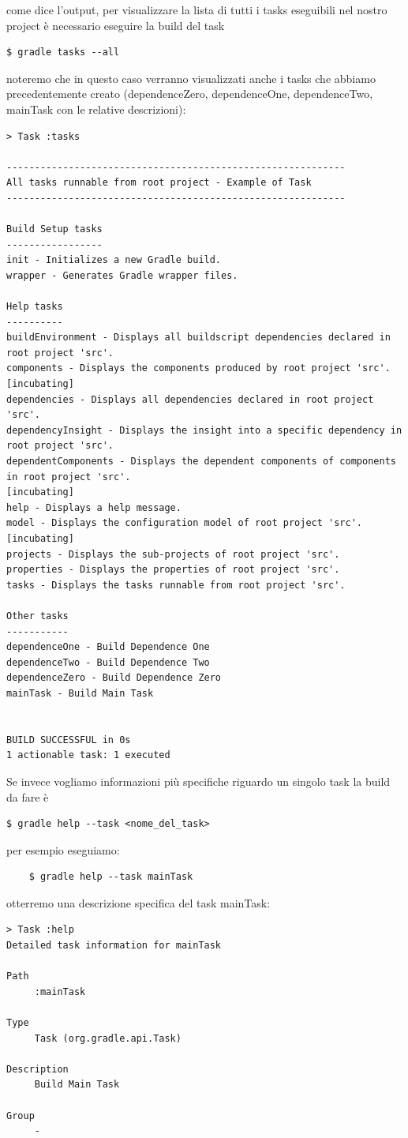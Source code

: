 come dice l'output, per visualizzare la lista di tutti i tasks eseguibili nel nostro project è necessario eseguire la build del task \begin{verbatim}$ gradle tasks --all \end{verbatim} noteremo che in questo caso verranno visualizzati anche i tasks che abbiamo precedentemente creato (dependenceZero, dependenceOne, dependenceTwo, mainTask con le relative descrizioni):
\begin{verbatim}
> Task :tasks 

------------------------------------------------------------
All tasks runnable from root project - Example of Task
------------------------------------------------------------

Build Setup tasks
-----------------
init - Initializes a new Gradle build.
wrapper - Generates Gradle wrapper files.

Help tasks
----------
buildEnvironment - Displays all buildscript dependencies declared in root project 'src'.
components - Displays the components produced by root project 'src'. [incubating]
dependencies - Displays all dependencies declared in root project 'src'.
dependencyInsight - Displays the insight into a specific dependency in root project 'src'.
dependentComponents - Displays the dependent components of components in root project 'src'. 
[incubating]
help - Displays a help message.
model - Displays the configuration model of root project 'src'. [incubating]
projects - Displays the sub-projects of root project 'src'.
properties - Displays the properties of root project 'src'.
tasks - Displays the tasks runnable from root project 'src'.

Other tasks
-----------
dependenceOne - Build Dependence One
dependenceTwo - Build Dependence Two
dependenceZero - Build Dependence Zero
mainTask - Build Main Task


BUILD SUCCESSFUL in 0s
1 actionable task: 1 executed
\end{verbatim}
Se invece vogliamo informazioni più specifiche riguardo un singolo task la build da fare è \begin{verbatim}$ gradle help --task <nome_del_task>\end{verbatim}per esempio eseguiamo:
\begin{verbatim}
    $ gradle help --task mainTask\end{verbatim}
otterremo una descrizione specifica del task mainTask:
\begin{verbatim}
> Task :help 
Detailed task information for mainTask

Path
     :mainTask

Type
     Task (org.gradle.api.Task)

Description
     Build Main Task

Group
     -\end{verbatim}

